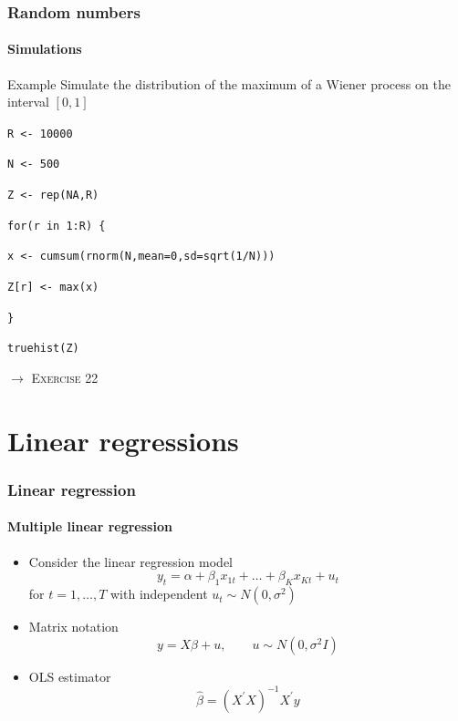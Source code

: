 \documentclass[title={Introduction to R}, author={Mutschler and Zaharieva}, inst={Institute for Econometrics and Empirical Economics}]{beamer}
\begin{document}
\begin{frame}
\frametitle{Random numbers}
\framesubtitle{Simulations}

\begin{block}{Example}
Simulate the distribution of the maximum of a Wiener process on the interval 
$[0,1]$\bigskip

\texttt{R <- 10000}

\texttt{N <- 500}

\texttt{Z <- rep(NA,R)}

\texttt{for(r in 1:R) \{}

\quad \texttt{x <- cumsum(rnorm(N,mean=0,sd=sqrt(1/N)))}

\quad \texttt{Z[r] <- max(x)}

\texttt{\}}

\texttt{truehist(Z)}
\end{block}\pause
$\longrightarrow $ \textsc{Exercise 22}
\end{frame}


\section{Linear regressions}
\begin{frame}
\frametitle{Linear regression}
\framesubtitle{Multiple linear regression}
\begin{itemize}
\item Consider the linear regression model%
\begin{equation*}
y_{t}=\alpha +\beta _{1}x_{1t}+\ldots +\beta _{K}x_{Kt}+u_{t}
\end{equation*}%
for $t=1,\ldots ,T$ with independent $u_{t}\sim N(0,\sigma ^{2})$
\item Matrix notation
\begin{equation*}
y=X\beta +u,\qquad u\sim N(0,\sigma ^{2}I)
\end{equation*}
\item OLS estimator
\begin{equation*}
\hat{\beta}=\left( X^{\prime }X\right) ^{-1}X^{\prime }y
\end{equation*}
\end{itemize}
\end{frame}
\end{document}
